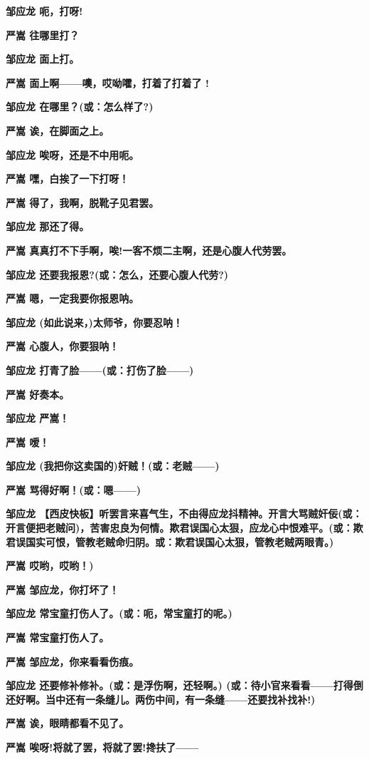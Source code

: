 \textbf{邹应龙 呃，打呀!}

\textbf{严嵩 往哪里打？}

\textbf{邹应龙 面上打。}

\textbf{严嵩 面上啊------噢，哎呦嚯，打着了打着了 !}

\textbf{邹应龙 在哪里？(或：怎么样了?)}

\textbf{严嵩 诶，在脚面之上。}

\textbf{邹应龙 唉呀，还是不中用呃。}

\textbf{严嵩 嘿，白挨了一下打呀！}

\textbf{严嵩 得了，我啊，脱靴子见君罢。}

\textbf{邹应龙 那还了得。}

\textbf{严嵩 真真打不下手啊，唉!一客不烦二主啊，还是心腹人代劳罢。}

\textbf{邹应龙 还要我报恩?(或：怎么，还要心腹人代劳?)}

\textbf{严嵩 嗯，一定我要你报恩呐。}

\textbf{邹应龙 (如此说来，)太师爷，你要忍呐！}

\textbf{严嵩 心腹人，你要狠呐！}

\textbf{邹应龙 打青了脸------(或：打伤了脸------)}

\textbf{严嵩 好奏本。}

\textbf{邹应龙 严嵩！}

\textbf{严嵩 嗳！}

\textbf{邹应龙 (我把你这卖国的)奸贼！(或：老贼------)}

\textbf{严嵩 骂得好啊！(或：嗯------)}

\textbf{邹应龙
【西皮快板】听罢言来喜气生，不由得应龙抖精神。开言大骂贼奸佞(或：开言便把老贼问)，苦害忠良为何情。欺君误国心太狠，应龙心中恨难平。(或：欺君误国实可恨，管教老贼命归阴。或：欺君误国心太狠，管教老贼两眼青。)}

\textbf{严嵩 哎哟，哎哟！)}

\textbf{严嵩 邹应龙，你打坏了！}

\textbf{邹应龙 常宝童打伤人了。(或：呃，常宝童打的呢。)}

\textbf{严嵩 常宝童打伤人了。}

\textbf{严嵩 邹应龙，你来看看伤痕。}

\textbf{邹应龙 还要修补修补。(或：是浮伤啊，还轻啊。)
(或：待小官来看看------打得倒还好啊。当中还有一条缝儿。两伤中间，有一条缝------还要找补找补!)}

\textbf{严嵩 诶，眼睛都看不见了。}

\textbf{严嵩 唉呀!将就了罢，将就了罢!搀扶了------}

